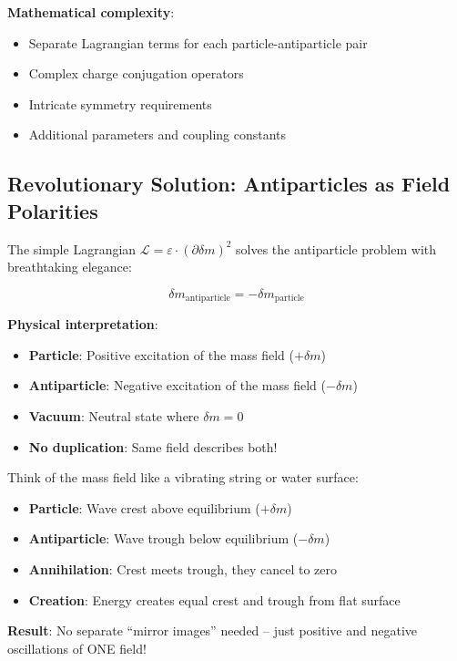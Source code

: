\documentclass[12pt,a4paper]{article}
\newcommand{\Lag}{\mathcal{L}}
\newcommand{\deltam}{\delta m}
\theoremstyle{definition}
\theoremstyle{remark}
\begin{document}
	\textbf{Mathematical complexity}:
	\begin{itemize}
		\item Separate Lagrangian terms for each particle-antiparticle pair
		\item Complex charge conjugation operators
		\item Intricate symmetry requirements
		\item Additional parameters and coupling constants
	\end{itemize}
	
	\subsection{Revolutionary Solution: Antiparticles as Field Polarities}
	
	The simple Lagrangian $\Lag = \varepsilon \cdot (\partial \deltam)^2$ solves the antiparticle problem with breathtaking elegance:
	
	\begin{equation}
		\boxed{\deltam_{\text{antiparticle}} = -\deltam_{\text{particle}}}
		\label{eq:antiparticle_solution}
	\end{equation}
	
	\textbf{Physical interpretation}:
	\begin{itemize}
		\item \textbf{Particle}: Positive excitation of the mass field ($+\deltam$)
		\item \textbf{Antiparticle}: Negative excitation of the mass field ($-\deltam$)  
		\item \textbf{Vacuum}: Neutral state where $\deltam = 0$
		\item \textbf{No duplication}: Same field describes both!
	\end{itemize}
	
	\begin{tcolorbox}[colback=green!5!white,colframe=green!75!black,title=Elegant Antiparticle Picture]
		Think of the mass field like a vibrating string or water surface:
		\begin{itemize}
			\item \textbf{Particle}: Wave crest above equilibrium ($+\deltam$)
			\item \textbf{Antiparticle}: Wave trough below equilibrium ($-\deltam$)
			\item \textbf{Annihilation}: Crest meets trough, they cancel to zero
			\item \textbf{Creation}: Energy creates equal crest and trough from flat surface
		\end{itemize}
		
		\textbf{Result}: No separate ``mirror images'' needed -- just positive and negative oscillations of ONE field!
	\end{tcolorbox}
	
\end{document}
